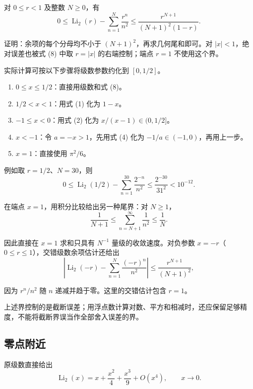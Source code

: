\documentclass[11pt,a4paper]{article}
\providecommand{\tightlist}{\setlength{\itemsep}{3pt}\setlength{\parskip}{0pt}}
\begin{document}
对 \(0\leqslant r<1\) 及整数 \(N\geqslant0\)，有
\begin{equation}
0\leqslant\operatorname{Li}_2(r)-\sum_{n=1}^N\frac{r^n}{n^2}
\leqslant\frac{r^{N+1}}{(N+1)^2(1-r)}.
\tag{8}
\end{equation}

证明：余项的每个分母均不小于 \((N+1)^2\)，再求几何尾和即可。对
\(|x|<1\)，绝对误差也被式 (8) 中取 \(r=|x|\) 的右端控制；端点 \(r=1\)
不使用这个界。

实际计算可按以下步骤将级数参数约化到 \([0,1/2]\)。

\begin{enumerate}
\def\labelenumi{\arabic{enumi}.}
\tightlist
\item
  \(0\leqslant x\leqslant1/2\)：直接用级数和式 (8)。
\item
  \(1/2<x<1\)：用式 (1) 化为 \(1-x\)。
\item
  \(-1\leqslant x<0\)：用式 (2) 化为 \(x/(x-1)\in(0,1/2]\)。
\item
  \(x<-1\)：令 \(a=-x>1\)，先用式 (4) 化为
  \(-1/a\in(-1,0)\)，再用上一步。
\item
  \(x=1\)：直接使用 \(\pi^2/6\)。
\end{enumerate}

例如取 \(r=1/2\)、\(N=30\)，则
\[
0\leqslant\operatorname{Li}_2(1/2)-\sum_{n=1}^{30}\frac{2^{-n}}{n^2}
\leqslant\frac{2^{-30}}{31^2}<10^{-12}.
\]

在端点 \(x=1\)，用积分比较给出另一种尾界：对 \(N\geqslant1\)，
\[
\frac1{N+1}\leqslant\sum_{n=N+1}^{\infty}\frac1{n^2}\leqslant\frac1N.
\]

因此直接在 \(x=1\) 求和只具有 \(N^{-1}\) 量级的收敛速度。对负参数
\(x=-r\)（\(0\leqslant r\leqslant1\)），交错级数余项估计还给出
\[
\left|\operatorname{Li}_2(-r)-\sum_{n=1}^N\frac{(-r)^n}{n^2}\right|
\leqslant\frac{r^{N+1}}{(N+1)^2},
\]

因为 \(r^n/n^2\) 随 \(n\) 递减并趋于零。这里的交错估计包含 \(r=1\)。

上述界控制的是截断误差；用浮点数计算对数、平方和相减时，还应保留足够精度，不能将截断界误当作全部舍入误差的界。

\hypertarget{ux96f6ux70b9ux9644ux8fd1}{%
\subsection{零点附近}\label{ux96f6ux70b9ux9644ux8fd1}}

原级数直接给出
\[
\operatorname{Li}_2(x)=x+\frac{x^2}{4}+\frac{x^3}{9}+O(x^4),
\qquad x\to0.
\]
\end{document}

